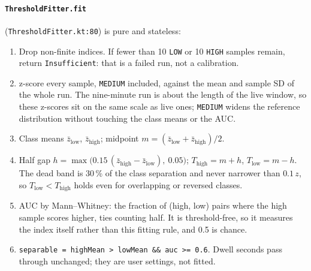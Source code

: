 \documentclass[10pt,a4paper]{article}
\newcommand{\file}[1]{\texttt{\small #1}}          %
\newcommand{\code}[1]{\texttt{#1}}                  %
\newcommand{\Thigh}{T_{\mathrm{high}}}
\newcommand{\Tlow}{T_{\mathrm{low}}}
\begin{document}
\paragraph{\code{ThresholdFitter.fit}} (\file{ThresholdFitter.kt:80}) is pure and stateless:
\begin{enumerate}
\item Drop non-finite indices. If fewer than 10 \code{LOW} or 10 \code{HIGH} samples remain,
  return \code{Insufficient}: that is a failed run, not a calibration.
\item z-score every sample, \code{MEDIUM} included, against the mean and sample SD of the whole run.
  The nine-minute run is about the length of the live window, so these z-scores sit on the same
  scale as live ones; \code{MEDIUM} widens the reference distribution without touching the class
  means or the AUC.
\item Class means $\bar z_{\text{low}}$, $\bar z_{\text{high}}$; midpoint
  $m = (\bar z_{\text{low}} + \bar z_{\text{high}})/2$.
\item Half gap $h = \max\bigl(0.15\,(\bar z_{\text{high}} - \bar z_{\text{low}}),\ 0.05\bigr)$;
  $\Thigh = m + h$, $\Tlow = m - h$. The dead band is 30\,\% of the class separation and never
  narrower than $0.1\,z$, so $\Tlow < \Thigh$ holds even for overlapping or reversed classes.
\item AUC by Mann--Whitney: the fraction of (high, low) pairs where the high sample scores higher,
  ties counting half. It is threshold-free, so it measures the index itself rather than this
  fitting rule, and 0.5 is chance.
\item \code{separable = highMean > lowMean \&\& auc >= 0.6}. Dwell seconds pass through unchanged;
  they are user settings, not fitted.
\end{enumerate}
\end{document}

